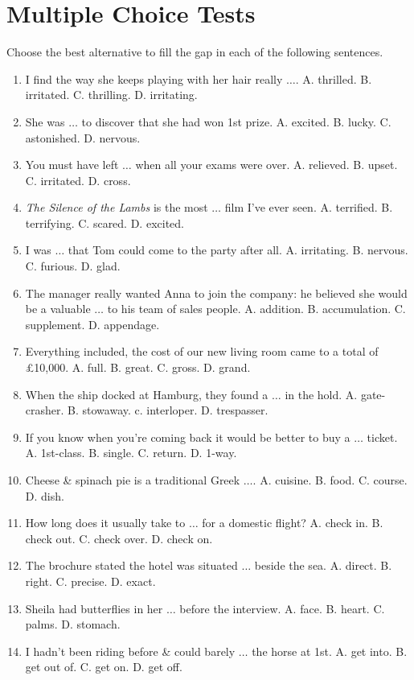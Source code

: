\documentclass{article}
\numberwithin{equation}{section}
\begin{document}
\section{Multiple Choice Tests}
Choose the best alternative to fill the gap in each of the following sentences.
\begin{enumerate}[leftmargin=2mm]
	\item I find the way she keeps playing with her hair really $\ldots$. A. thrilled. B. irritated. C. thrilling. D. irritating.
	\item She was $\ldots$ to discover that she had won 1st prize. A. excited. B. lucky. C. astonished. D. nervous.
	\item You must have left $\ldots$ when all your exams were over. A. relieved. B. upset. C. irritated. D. cross.
	\item \textit{The Silence of the Lambs} is the most $\ldots$ film I've ever seen. A. terrified. B. terrifying. C. scared. D. excited.
	\item I was $\ldots$ that Tom could come to the party after all. A. irritating. B. nervous. C. furious. D. glad.
	\item The manager really wanted Anna to join the company: he believed she would be a valuable $\ldots$ to his team of sales people. A. addition. B. accumulation. C. supplement. D. appendage.
	\item Everything included, the cost of our new living room came to a total of \pounds10,000. A. full. B. great. C. gross. D. grand.
	\item When the ship docked at Hamburg, they found a $\ldots$ in the hold. A. gate-crasher. B. stowaway. c. interloper. D. trespasser.
	\item If you know when you're coming back it would be better to buy a $\ldots$ ticket. A. 1st-class. B. single. C. return. D. 1-way.
	\item Cheese \& spinach pie is a traditional Greek $\ldots$. A. cuisine. B. food. C. course. D. dish.
	\item How long does it usually take to $\ldots$ for a domestic flight? A. check in. B. check out. C. check over. D. check on.
	\item The brochure stated the hotel was situated $\ldots$ beside the sea. A. direct. B. right. C. precise. D. exact.
	\item Sheila had butterflies in her $\ldots$ before the interview. A. face. B. heart. C. palms. D. stomach.
	\item I hadn't been riding before \& could barely $\ldots$ the horse at 1st. A. get into. B. get out of. C. get on. D. get off.

\end{enumerate}
\end{document}
